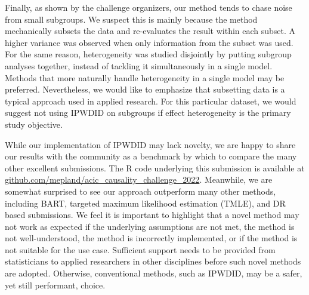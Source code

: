 \documentclass[twoside,11pt]{article}
\newcommand*{\IPWDID}{\ensuremath{\text{IPWDID}}\xspace}
\newcommand{\R}{\textsc{R}\xspace}
\begin{document}
Finally, as shown by the challenge organizers, our method tends to chase noise from small subgroups.
We suspect this is mainly because the method mechanically subsets the data and re-evaluates the result within each subset.
A higher variance was observed when only information from the subset was used.
For the same reason, heterogeneity was studied disjointly by putting subgroup analyses together,
instead of tackling it simultaneously in a single model.
Methods that more naturally handle heterogeneity in a single model may be preferred.
Nevertheless, we would like to emphasize that subsetting data is a typical approach used in applied research.
For this particular dataset, we would suggest not using \IPWDID on subgroups
if effect heterogeneity is the primary study objective.

While our implementation of \IPWDID may lack novelty,
we are happy to share our results with the community as a benchmark
by which to compare the many other excellent submissions.
The \R code underlying this submission is available at
\href{https://github.com/mepland/acic\_causality\_challenge\_2022}{github.com/mepland/acic\_causality\_challenge\_2022}.
Meanwhile, we are somewhat surprised to see our approach outperform many other methods, including
BART, targeted maximum likelihood estimation (TMLE), and DR based submissions.
We feel it is important to highlight that a novel method may not work as expected if
the underlying assumptions are not met,
the method is not well-understood,
the method is incorrectly implemented,
or if
the method is not suitable for the use case.
Sufficient support needs to be provided from statisticians to applied researchers
in other disciplines before such novel methods are adopted.
Otherwise, conventional methods, such as \IPWDID, may be a safer, yet still performant, choice.








\vskip 0.2in


\end{document}
